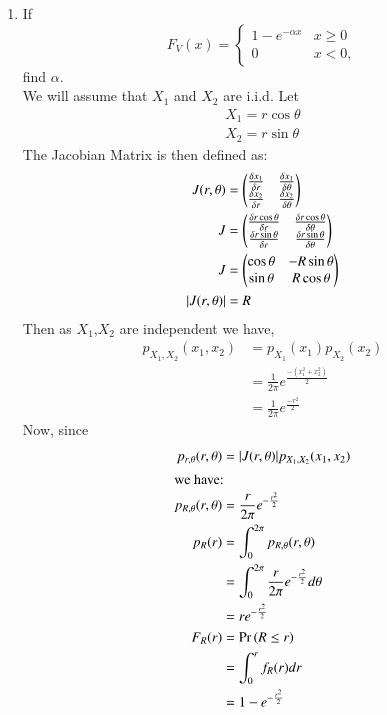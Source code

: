 \documentclass[journal,12pt,twocolumn]{IEEEtran}
\renewcommand\thesection{\arabic{section}}
\begin{document}
\begin{enumerate}[label=\thesection.\arabic*
,ref=\thesection.\theenumi]
\item
If
\[
F_{V}(x) = 
\begin{cases}
1 - e^{-\alpha x} & x \geq 0 \\
0 & x < 0,
\end{cases}
\]
find $\alpha$.\\

\solution We will assume that $X_1$ and $X_2$ are i.i.d. 
Let
\begin{align*}
    X_1 = r \cos{\theta} \\
    X_2 = r \sin{\theta} 
\end{align*}
 The Jacobian Matrix is then defined as: 
 \begin{align*}
    J(r,\theta)  & = \begin{pmatrix}\frac{\delta x_1}{\delta r}    & \frac{\delta x_1}{\delta \theta} \\ \frac{\delta x_2}{\delta r} & \frac{\delta x_2}{\delta \theta}\end{pmatrix}\\
    J &=  \begin{pmatrix}\frac{\delta r \cos{\theta}}{\delta r} & \frac{\delta  r \cos{\theta}}{\delta \theta} \\ \frac{\delta r \sin{\theta}}{\delta r}  & \frac{\delta r \sin{\theta}}{\delta \theta}\end{pmatrix}\\
    J    & = \begin{pmatrix}\cos\theta    & -R\sin\theta    \\ \sin\theta & R\cos\theta\end{pmatrix} \\
    |J(r,\theta)|  & = R
 \end{align*}
Then as $X_1$,$X_2$ are independent we have, 
\begin{align*}
    p_{X_1,X_2}(x_1,x_2) &= p_{X_1}(x_1)p_{X_2}(x_2) \\
    &= \frac{1}{2\pi} e^{\frac{-(x_1^2+x_2^2)}{2}} \\
    &= \frac{1}{2\pi} e^{\frac{-r^2}{2}}
\end{align*}
Now, since 
\begin{align*}
    p_{r, \theta}(r, \theta) &= |J(r,\theta)|p_{X_1, X_2}(x_1, x_2)      \\   
\intertext{we have:}     
p_{R, \theta}(r, \theta) & = \frac{r}{2\pi} e^{-\frac{r^2}{2}}  \\
p_R(r)&=\int_0^{2\pi} p_{R, \theta}(r, \theta) \\
   & = \int_0^{2\pi} \frac{r}{2\pi} e^{-\frac{r^2}{2}} d\theta   \\
    & = r e^{-\frac{r^2}{2}}  \\
    F_R(r) &= \pr{R \leq r} \\
    &= \int _{0} ^r f_R(r) dr \\
    &= 1 - e^{-\frac{r^2}{2}}

\end{align*}
\end{enumerate}
\end{document}

